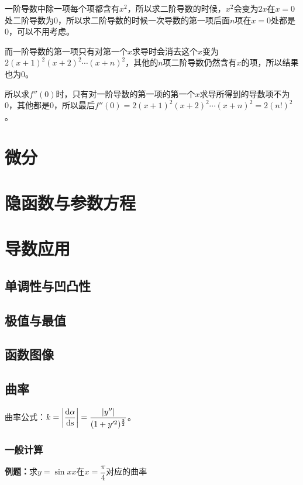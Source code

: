 \documentclass[UTF8, 12pt]{ctexart}
\begin{document}
一阶导数中除一项每个项都含有$x^2$，所以求二阶导数的时候，$x^2$会变为$2x$在$x=0$处二阶导数为0，所以求二阶导数的时候一次导数的第一项后面$n$项在$x=0$处都是0，可以不用考虑。

而一阶导数的第一项只有对第一个$x$求导时会消去这个$x$变为$2(x+1)^2(x+2)^2\cdots(x+n)^2$，其他的$n$项二阶导数仍然含有$x$的项，所以结果也为0。

所以求$f''(0)$时，只有对一阶导数的第一项的第一个$x$求导所得到的导数项不为0，其他都是0，所以最后$f''(0)=2(x+1)^2(x+2)^2\cdots(x+n)^2=2(n!)^2$。

\section{微分}

\section{隐函数与参数方程}

\section{导数应用}

\subsection{单调性与凹凸性}

\subsection{极值与最值}

\subsection{函数图像}

\subsection{曲率}

曲率公式：$k=\left\lvert\dfrac{\rm{d}\alpha}{\rm{d}s}\right\rvert=\dfrac{\vert y''\vert}{(1+y'^2)^{\frac{3}{2}}}$。

\subsubsection{一般计算}

\textbf{例题：}求$y=\sin xx$在$x=\dfrac{\pi}{4}$对应的曲率
\end{document}
